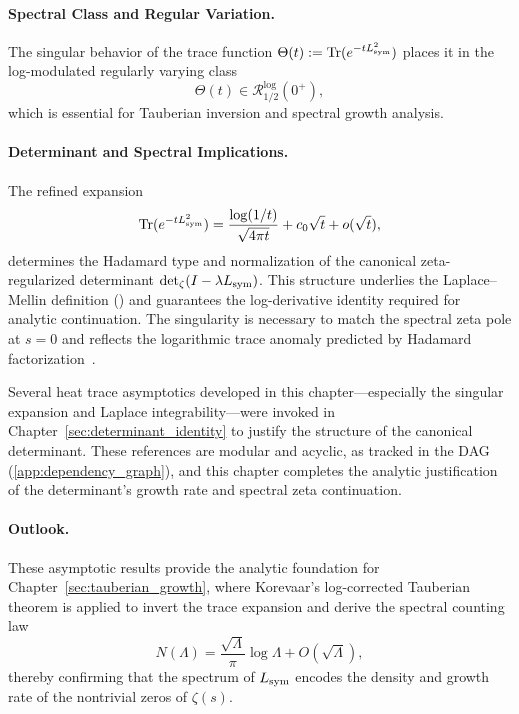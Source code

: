 \paragraph{Spectral Class and Regular Variation.}
The singular behavior of the trace function \( \Theta(t) := \operatorname{Tr}(e^{-t L_{\mathrm{sym}}^2}) \) places it in the log-modulated regularly varying class
\[
\Theta(t) \in \mathcal{R}_{1/2}^{\log}(0^+),
\]
which is essential for Tauberian inversion and spectral growth analysis.

\paragraph{Determinant and Spectral Implications.}
The refined expansion
\[
\operatorname{Tr}(e^{-t L_{\mathrm{sym}}^2}) = \frac{\log(1/t)}{\sqrt{4\pi t}} + c_0 \sqrt{t} + o(\sqrt{t}),
\]
determines the Hadamard type and normalization of the canonical zeta-regularized determinant \( \det\nolimits_{\zeta}(I - \lambda L_{\mathrm{sym}}) \). This structure underlies the Laplace–Mellin definition () and guarantees the log-derivative identity required for analytic continuation. The singularity is necessary to match the spectral zeta pole at \( s = 0 \) and reflects the logarithmic trace anomaly predicted by Hadamard factorization~\cite[Ch.~III]{Korevaar2004Tauberian}.

\begin{remark}
Several heat trace asymptotics developed in this chapter—especially the singular expansion and Laplace integrability—were invoked in Chapter~\ref{sec:determinant_identity} to justify the structure of the canonical determinant. These references are modular and acyclic, as tracked in the DAG (\cref{app:dependency_graph}), and this chapter completes the analytic justification of the determinant’s growth rate and spectral zeta continuation.
\end{remark}

\paragraph{Outlook.}
These asymptotic results provide the analytic foundation for Chapter~\ref{sec:tauberian_growth}, where Korevaar’s log-corrected Tauberian theorem is applied to invert the trace expansion and derive the spectral counting law
\[
N(\Lambda) = \frac{\sqrt{\Lambda}}{\pi} \log \Lambda + O(\sqrt{\Lambda}),
\]
thereby confirming that the spectrum of \( L_{\mathrm{sym}} \) encodes the density and growth rate of the nontrivial zeros of \( \zeta(s) \).
